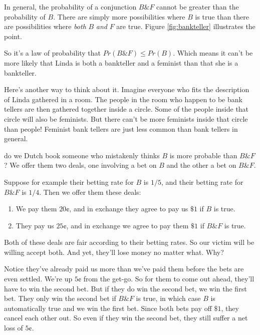 \documentclass[justified]{tufte-book}
\providecommand{\tightlist}{%
  \setlength{\itemsep}{0pt}\setlength{\parskip}{0pt}}
\renewcommand{\wedge}{\mathbin{\&}}
\newcommand{\p}{Pr}
\theoremstyle{definition}
\theoremstyle{definition}
\theoremstyle{definition}
\theoremstyle{remark}
\begin{document}
In general, the probability of a conjunction \(B \wedge F\) cannot be
greater than the probability of \(B\). There are simply more
possibilities where \(B\) is true than there are possibilities where
\emph{both} \(B\) \emph{and} \(F\) are true. Figure \ref{fig:bankteller}
illustrates the point.

So it's a law of probability that \(\p(B \wedge F) \leq \p(B)\). Which
means it can't be more likely that Linda is both a bankteller and a
feminist than that she is a bankteller.

Here's another way to think about it. Imagine everyone who fits the
description of Linda gathered in a room. The people in the room who
happen to be bank tellers are then gathered together inside a circle.
Some of the people inside that circle will also be feminists. But there
can't be more feminists inside that circle than people! Feminist bank
tellers are just less common than bank tellers in general.

 do we Dutch book someone who mistakenly thinks \(B\) is
more probable than \(B \wedge F\)? We offer them two deals, one
involving a bet on \(B\) and the other a bet on \(B \wedge F\).

Suppose for example their betting rate for \(B\) is \(1/5\), and their
betting rate for \(B \wedge F\) is \(1/4\). Then we offer them these
deals:

\begin{enumerate}
\def\labelenumi{\arabic{enumi}.}
\tightlist
\item
  We pay them \(20\)¢, and in exchange they agree to pay us \(\$1\) if
  \(B\) is true.
\item
  They pay us \(25\)¢, and in exchange we agree to pay them \(\$1\) if
  \(B \wedge F\) is true.
\end{enumerate}

Both of these deals are fair according to their betting rates. So our
victim will be willing accept both. And yet, they'll lose money no
matter what. Why?

Notice they've already paid us more than we've paid them before the bets
are even settled. We're up \(5\)¢ from the get-go. So for them to come
out ahead, they'll have to win the second bet. But if they do win the
second bet, we win the first bet. They only win the second bet if
\(B \wedge F\) is true, in which case \(B\) is automatically true and we
win the first bet. Since both bets pay off \(\$1\), they cancel each
other out. So even if they win the second bet, they still suffer a net
loss of \(5\)¢.
\end{document}
